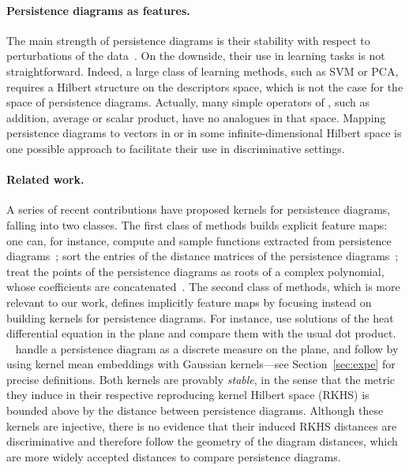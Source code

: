 \documentclass[11pt]{article}
\begin{document}
\paragraph{Persistence diagrams as features.} 
The main strength of persistence diagrams is their stability with respect to perturbations of the data~\cite{Chazal09c,Chazal13b}.
On the downside, their use in learning tasks is not straightforward.
Indeed, a large class of learning methods, such as SVM or PCA, requires
a Hilbert structure on the descriptors space, which is not the case
for the space of persistence diagrams. Actually, many simple operators of , such
as addition, average or scalar product, have no analogues in that
space. Mapping persistence diagrams to vectors in  or in some infinite-dimensional Hilbert space 
is one possible approach to facilitate their use in discriminative settings.


\paragraph{Related work.} A series of recent contributions have proposed kernels for persistence diagrams,
falling into two classes.  The first class of methods builds explicit
feature maps: one can, for instance, compute and sample functions extracted from
persistence diagrams~\cite{Bubenik15,Adams17,Robins16}; sort the entries of
the distance matrices of the persistence diagrams~\cite{Carriere15a}; treat the
points of the persistence diagrams as roots of a complex polynomial, whose coefficients are
concatenated~\cite{diFabio15}.
The second class of methods, which is more relevant to our work, defines implicitly feature maps by focusing instead on building kernels for persistence diagrams. For
instance, \cite{Reininghaus15} use
solutions of the heat differential equation in the plane and compare them
with the usual  dot product.
~\cite{Kusano16} handle a persistence diagram as a discrete measure on the plane,
and follow by using kernel mean embeddings with Gaussian kernels---see
Section~\ref{sec:expe} for precise definitions.
Both kernels are provably {\em stable}, in the sense that the metric they induce in their respective reproducing kernel Hilbert space (RKHS) 
is bounded above by the distance between persistence diagrams. 
Although these kernels are injective, there is no evidence that their induced RKHS distances are discriminative and therefore follow 
the geometry of the diagram distances, which are more widely accepted distances to compare persistence diagrams.
\end{document}
